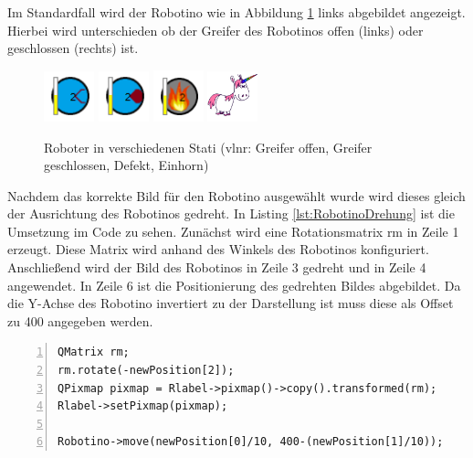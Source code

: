 Im Standardfall wird der Robotino wie in Abbildung \ref{fig:Robotino} links abgebildet angezeigt. Hierbei wird unterschieden ob der Greifer des Robotinos offen (links) oder geschlossen (rechts) ist. 

\begin{figure}[htb]
    \centering
    \includegraphics[width=0.13\textwidth]{Abbildungen/RobotinoGoffen.png}
    \includegraphics[width=0.13\textwidth]{Abbildungen/RobotinoGZu.png}
    \includegraphics[width=0.13\textwidth]{Abbildungen/RobotinoDefect.png}
    \includegraphics[width=0.13\textwidth]{Abbildungen/Einhorn.png}
    \caption{Roboter in verschiedenen Stati (vlnr: Greifer offen, Greifer geschlossen, Defekt, Einhorn)}		
    \label{fig:Robotino}
\end{figure}

Nachdem das korrekte Bild für den Robotino ausgewählt wurde wird dieses gleich der Ausrichtung des Robotinos gedreht. In Listing \ref{lst:RobotinoDrehung} ist die Umsetzung im Code zu sehen. Zunächst wird eine Rotationsmatrix rm in Zeile 1 erzeugt. Diese Matrix wird anhand des Winkels des Robotinos konfiguriert. Anschließend wird der Bild des Robotinos in Zeile 3 gedreht und in Zeile 4 angewendet. In Zeile 6 ist die Positionierung des gedrehten Bildes abgebildet. Da die Y-Achse des Robotino invertiert zu der Darstellung ist muss diese als Offset zu 400 angegeben werden. 

\begin{lstlisting}[frame=single, breaklines=true, numbers=left, stepnumber=2, firstnumber=1, numberstyle = \tiny, caption=Robotino Drehung ,label=lst:RobotinoDrehung]
QMatrix rm;
rm.rotate(-newPosition[2]);
QPixmap pixmap = Rlabel->pixmap()->copy().transformed(rm);
Rlabel->setPixmap(pixmap);

Robotino->move(newPosition[0]/10, 400-(newPosition[1]/10));
\end{lstlisting}

